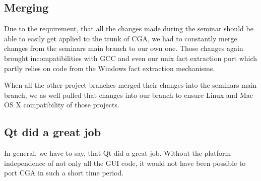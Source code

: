 \subsection{Merging} Due to the requirement, that all the changes made during the seminar should be able to easily get applied to the trunk of CGA, we had to constantly merge changes from the seminars main branch to our own one. Those changes again brought incompatibilities with GCC and even our unix fact extraction port which partly relies on code from the Windows fact extraction mechanisms.

When all the other project branches merged their changes into the seminars main branch, we as well pulled that changes into our branch to ensure Linux and Mac OS X compatibility of those projects.

\subsection{Qt did a great job} In general, we have to say, that Qt did a great job. Without the platform independence of not only all the GUI code, it would not have been possible to port CGA in such a short time period. 
